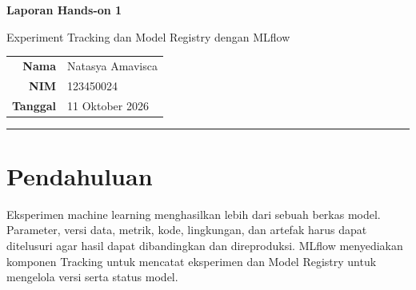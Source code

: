 \documentclass[11pt,a4paper]{article}
\begin{document}
\begin{center}
  {\LARGE\bfseries\color{navy} Laporan Hands-on 1}\par
  \vspace{3pt}
  {\large Experiment Tracking dan Model Registry dengan MLflow}\par
  \vspace{10pt}
  \begin{tabular}{rl}
    \textbf{Nama} & Natasya Amavisca \\
    \textbf{NIM}  & 123450024 \\
    \textbf{Tanggal} & 11 Oktober 2026
  \end{tabular}
\end{center}

\vspace{8pt}
\hrule
\vspace{8pt}

\begin{abstract}
Praktik ini mengimplementasikan siklus eksperimen machine learning menggunakan MLflow pada dataset Breast Cancer Wisconsin. Implementasi meliputi tracking server lokal, manual logging Random Forest, logging metrik PyTorch per epoch, autologging Scikit-learn, rancangan tuning Optuna dengan nested runs, perbandingan run, Model Registry, alias model, dan inferensi. Eksekusi MLflow melalui backend SQLite menghasilkan dua run kandidat. Logistic Regression terpilih dengan validation ROC-AUC 0,995370 dan F1 0,986111, sedikit lebih baik daripada Random Forest dengan ROC-AUC 0,994048 dan F1 0,965517. Model terpilih berhasil diregistrasikan sebagai versi 1, diberi alias \texttt{challenger} dan \texttt{champion}, kemudian dimuat kembali untuk prediksi. Pelatihan PyTorch juga berhasil diuji selama 15 epoch, sedangkan eksekusi Optuna tertunda karena dependensi tidak tersedia pada lingkungan praktik.
\end{abstract}

\tableofcontents

\section{Pendahuluan}

Eksperimen machine learning menghasilkan lebih dari sebuah berkas model. Parameter, versi data, metrik, kode, lingkungan, dan artefak harus dapat ditelusuri agar hasil dapat dibandingkan dan direproduksi. MLflow menyediakan komponen Tracking untuk mencatat eksperimen dan Model Registry untuk mengelola versi serta status model.
\end{document}
